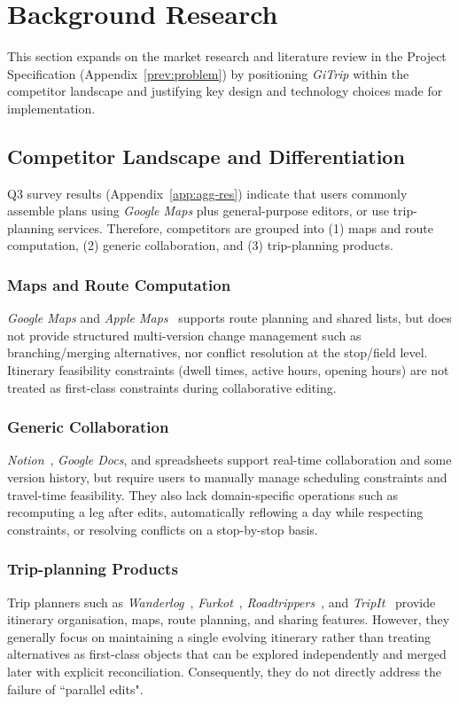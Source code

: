 \section{Background Research}
\label{sec:background}

This section expands on the market research and literature review in the Project Specification (Appendix~\ref{prev:problem}) by positioning \textit{GiTrip} within the competitor landscape and justifying key design and technology choices made for implementation.

\subsection{Competitor Landscape and Differentiation}
\label{sec:competitors}

Q3 survey results (Appendix~\ref{app:agg-res}) indicate that users commonly assemble plans using \textit{Google Maps} plus general-purpose editors, or use trip-planning services. Therefore, competitors are grouped into (1) maps and route computation,  (2) generic collaboration, and (3) trip-planning products.

\subsubsection{Maps and Route Computation}
\textit{Google Maps} and \textit{Apple Maps}~\cite{apple-maps} supports route planning and shared lists, but does not provide structured multi-version change management such as branching/merging alternatives, nor conflict resolution at the stop/field level. Itinerary feasibility constraints (dwell times, active hours, opening hours) are not treated as first-class constraints during collaborative editing.

\subsubsection{Generic Collaboration}
\textit{Notion}~\cite{notion}, \textit{Google Docs}, and spreadsheets support real-time collaboration and some version history, but require users to manually manage scheduling constraints and travel-time feasibility. They also lack domain-specific operations such as recomputing a leg after edits, automatically reflowing a day while respecting constraints, or resolving conflicts on a stop-by-stop basis.

\subsubsection{Trip-planning Products}
Trip planners such as \textit{Wanderlog}~\cite{wanderlog}, \textit{Furkot}~\cite{furkot}, \textit{Roadtrippers}~\cite{roadtrippers}, and \textit{TripIt}~\cite{tripit} provide itinerary organisation, maps, route planning, and sharing features. However, they generally focus on maintaining a single evolving itinerary rather than treating alternatives as first-class objects that can be explored independently and merged later with explicit reconciliation. Consequently, they do not directly address the failure of ``parallel edits".

